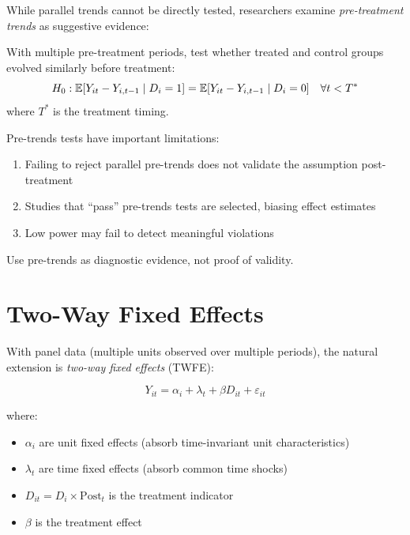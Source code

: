 While parallel trends cannot be directly tested, researchers examine \emph{pre-treatment trends} as suggestive evidence:

\begin{definition}
With multiple pre-treatment periods, test whether treated and control groups evolved similarly before treatment:
\begin{equation}
H_0: \mathbb{E}[Y_{it} - Y_{i,t-1} \mid D_i = 1] = \mathbb{E}[Y_{it} - Y_{i,t-1} \mid D_i = 0] \quad \forall t < T^*
\end{equation}
where $T^*$ is the treatment timing.
\end{definition}

\begin{remark}
\label{rem:roth_warning}
Pre-trends tests have important limitations:
\begin{enumerate}
    \item Failing to reject parallel pre-trends does not validate the assumption post-treatment
    \item Studies that ``pass'' pre-trends tests are selected, biasing effect estimates
    \item Low power may fail to detect meaningful violations
\end{enumerate}
Use pre-trends as diagnostic evidence, not proof of validity.
\end{remark}

\section{Two-Way Fixed Effects}
\label{sec:did_twfe}

With panel data (multiple units observed over multiple periods), the natural extension is \emph{two-way fixed effects} (TWFE):

\begin{equation}
Y_{it} = \alpha_i + \lambda_t + \beta D_{it} + \varepsilon_{it}
\label{eq:twfe}
\end{equation}

where:
\begin{itemize}
    \item $\alpha_i$ are unit fixed effects (absorb time-invariant unit characteristics)
    \item $\lambda_t$ are time fixed effects (absorb common time shocks)
    \item $D_{it} = D_i \times \text{Post}_t$ is the treatment indicator
    \item $\beta$ is the treatment effect
\end{itemize}

